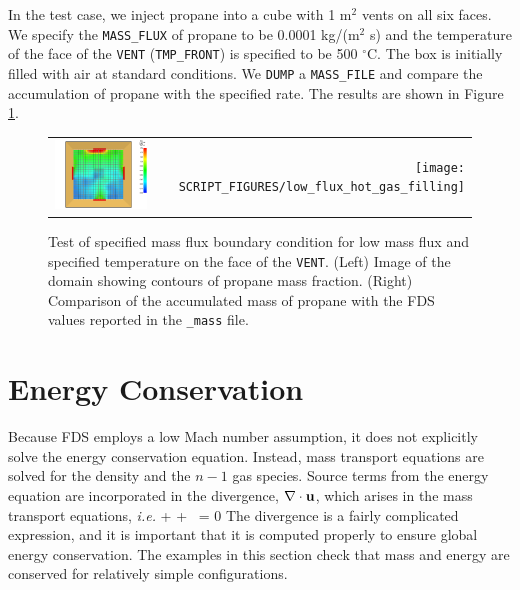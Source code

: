 \documentclass[11pt]{book}
\newcommand{\ct}{\tt\small}
\begin{document}
In the test case, we inject propane into a cube with 1 m$^2$ vents on all six faces.  We specify the {\ct MASS\_FLUX} of propane to be 0.0001 kg/(m$^2$ s) and the temperature of the face of the {\ct VENT} ({\ct TMP\_FRONT}) is specified to be 500 $^\circ$C.  The box is initially filled with air at standard conditions.  We {\ct DUMP} a {\ct MASS\_FILE} and compare the accumulation of propane with the specified rate.  The results are shown in Figure \ref{fig_low_flux_hot_gas_filling}.

\begin{figure}[h]
\begin{tabular*}{\textwidth}{lr}
\includegraphics[width=3.2in]{FIGURES/low_flux_hot_gas_filling_domain} &
\texttt{[image: SCRIPT\_FIGURES/low\_flux\_hot\_gas\_filling]}
\end{tabular*}
\caption[Low flux of hot gas into a closed domain]{Test of specified mass flux boundary condition for low mass flux and specified temperature on the face of the {\ct VENT}. (Left) Image of the domain showing contours of propane mass fraction. (Right) Comparison of the accumulated mass of propane with the FDS values reported in the {\ct \_mass} file.}
\label{fig_low_flux_hot_gas_filling}
\end{figure}


\clearpage

\section{Energy Conservation}

Because FDS employs a low Mach number assumption, it does not explicitly solve the energy conservation equation. Instead, mass transport equations are solved for the
density and the $n-1$ gas species. Source terms from the energy equation are incorporated in the divergence, $\nabla \cdot {\bf u}$, which arises in the
mass transport equations, {\em i.e.}
\be {} + \bu \cdot \nabla \rho + \rho \, \nabla \cdot \bu = 0 \ee
The divergence is a fairly complicated expression, and it is important that it is computed properly to ensure global energy conservation.
The examples in this section check that mass and energy are conserved for relatively simple configurations.
\end{document}
